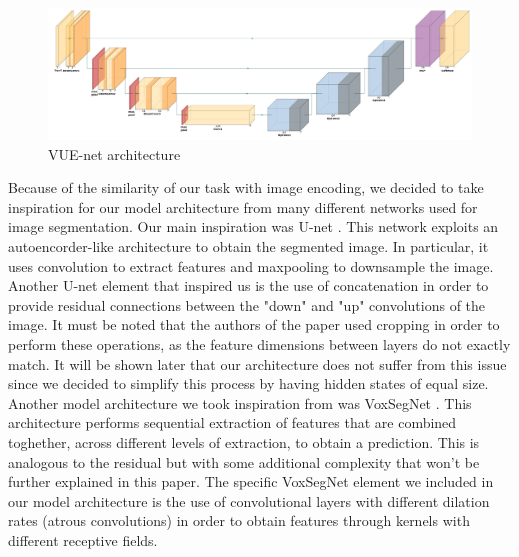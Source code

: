 \begin{figure}[ht]
  \centering
  \includegraphics[width=\textwidth]{images/VUE_net_model.png}
  \caption{VUE-net architecture}
  \label{fig:model}
\end{figure}

Because of the similarity of our task with image encoding, we decided to take inspiration for our model architecture
from many different networks used for image segmentation. Our main inspiration was U-net \cite{Unet}.
This network exploits an autoencorder-like architecture to obtain the segmented image.
In particular, it uses convolution to extract features and maxpooling to downsample the image.
Another U-net element that inspired us is the use of concatenation in order to provide
residual connections between the "down" and "up" convolutions of the image. It must be noted that
the authors of the paper used cropping in order to perform these operations, as the feature dimensions between layers do not exactly match. 
It will be shown later that our architecture does not suffer from this issue since we decided to simplify 
this process by having hidden states of equal size.
Another model architecture we took inspiration from was VoxSegNet \cite{VoxSegNet}. This architecture performs 
sequential extraction of features that are combined toghether, across different levels of extraction, to obtain a prediction. 
This is analogous to the residual but with some additional complexity that won't be
further explained in this paper. 
The specific VoxSegNet element we included in our model architecture is the use of convolutional layers with different dilation rates 
(atrous convolutions) in order to obtain features through kernels with different receptive fields.

